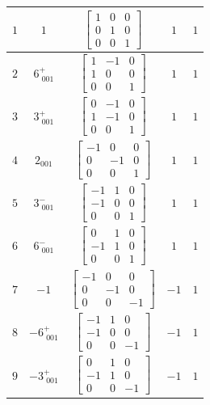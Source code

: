 \documentclass[fleqn,8pt]{jsarticle}
\begin{document}
\begin{longtable}{ccccc}
$ 1 $ & $ 1 $ & $ \begin{bmatrix} 1 & 0 & 0 \\ 0 & 1 & 0 \\ 0 & 0 & 1 \end{bmatrix} $ & $ 1 $ & $ 1 $ \\ \hline
$ 2 $ & $ 6^{+}_{\,\,001} $ & $ \begin{bmatrix} 1 & -1 & 0 \\ 1 & 0 & 0 \\ 0 & 0 & 1 \end{bmatrix} $ & $ 1 $ & $ 1 $ \\ \hline
$ 3 $ & $ 3^{+}_{\,\,001} $ & $ \begin{bmatrix} 0 & -1 & 0 \\ 1 & -1 & 0 \\ 0 & 0 & 1 \end{bmatrix} $ & $ 1 $ & $ 1 $ \\ \hline
$ 4 $ & $ 2{}_{001} $ & $ \begin{bmatrix} -1 & 0 & 0 \\ 0 & -1 & 0 \\ 0 & 0 & 1 \end{bmatrix} $ & $ 1 $ & $ 1 $ \\ \hline
$ 5 $ & $ 3^{-}_{\,\,001} $ & $ \begin{bmatrix} -1 & 1 & 0 \\ -1 & 0 & 0 \\ 0 & 0 & 1 \end{bmatrix} $ & $ 1 $ & $ 1 $ \\ \hline
$ 6 $ & $ 6^{-}_{\,\,001} $ & $ \begin{bmatrix} 0 & 1 & 0 \\ -1 & 1 & 0 \\ 0 & 0 & 1 \end{bmatrix} $ & $ 1 $ & $ 1 $ \\ \hline
$ 7 $ & $ -1 $ & $ \begin{bmatrix} -1 & 0 & 0 \\ 0 & -1 & 0 \\ 0 & 0 & -1 \end{bmatrix} $ & $ -1 $ & $ 1 $ \\ \hline
$ 8 $ & $ -6^{+}_{\,\,001} $ & $ \begin{bmatrix} -1 & 1 & 0 \\ -1 & 0 & 0 \\ 0 & 0 & -1 \end{bmatrix} $ & $ -1 $ & $ 1 $ \\ \hline
$ 9 $ & $ -3^{+}_{\,\,001} $ & $ \begin{bmatrix} 0 & 1 & 0 \\ -1 & 1 & 0 \\ 0 & 0 & -1 \end{bmatrix} $ & $ -1 $ & $ 1 $ \\ \hline

\end{longtable}
\end{document}
